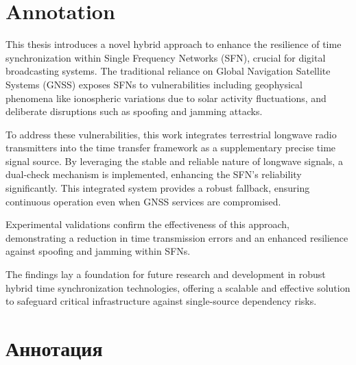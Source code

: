 \documentclass[12pt, a4paper]{extarticle}
\begin{document}
\addtocounter{page}{1}

\tableofcontents
\pagebreak

\section*{Annotation}
This thesis introduces a novel hybrid approach to enhance the resilience of
time synchronization within Single Frequency Networks (SFN), crucial for
digital broadcasting systems. The traditional reliance on Global Navigation
Satellite Systems (GNSS) exposes SFNs to vulnerabilities including geophysical
phenomena like ionospheric variations due to solar activity fluctuations, and
deliberate disruptions such as spoofing and jamming attacks.

To address these vulnerabilities, this work integrates terrestrial longwave
radio transmitters into the time transfer framework as a supplementary
precise time signal source. By leveraging the stable and reliable nature of
longwave signals, a dual-check mechanism is implemented, enhancing the SFN's
reliability significantly. This integrated system provides a robust fallback,
ensuring continuous operation even when GNSS services are compromised.

Experimental validations confirm the effectiveness of this approach,
demonstrating a reduction in time transmission errors and an enhanced resilience
against spoofing and jamming within SFNs.

The findings lay a foundation for future research and development in robust
hybrid time synchronization technologies, offering a scalable and effective
solution to safeguard critical infrastructure against single-source dependency
risks.

\section*{Аннотация}
\end{document}
